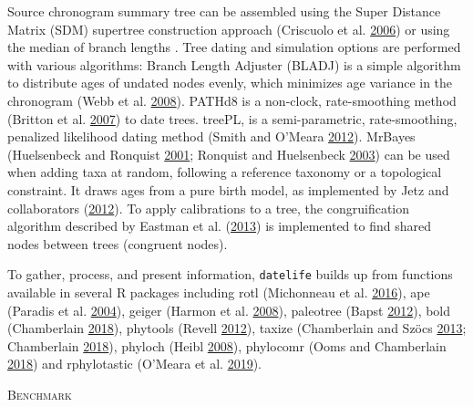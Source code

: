 \documentclass[]{article}
\begin{document}
Source chronogram summary tree can be assembled using the Super Distance Matrix
(SDM) supertree construction approach (Criscuolo et al. \protect\hyperlink{ref-Criscuolo2006}{2006}) or using the median of branch
lengths .
Tree dating and simulation options are performed with various algorithms:
Branch Length Adjuster (BLADJ) is a simple algorithm to distribute ages of undated
nodes evenly, which minimizes age variance in the chronogram (Webb et al. \protect\hyperlink{ref-Webb2008}{2008}).
PATHd8 is a non-clock, rate-smoothing method (Britton et al. \protect\hyperlink{ref-Britton2007}{2007}) to date trees.
treePL, is a semi-parametric, rate-smoothing, penalized likelihood dating method
(Smith and O'Meara \protect\hyperlink{ref-Smith2012}{2012}).
MrBayes (Huelsenbeck and Ronquist \protect\hyperlink{ref-Huelsenbeck2001}{2001}; Ronquist and Huelsenbeck \protect\hyperlink{ref-Ronquist2003}{2003}) can be used when adding taxa at
random, following a reference taxonomy or a topological constraint. It draws ages
from a pure birth model, as implemented by Jetz and collaborators (\protect\hyperlink{ref-Jetz2012}{2012}).
To apply calibrations to a tree, the congruification algorithm described by Eastman et al. (\protect\hyperlink{ref-Eastman2013}{2013})
is implemented to find shared nodes between trees (congruent nodes).

To gather, process, and present information, \texttt{datelife} builds up from functions
available in several R packages including rotl (Michonneau et al. \protect\hyperlink{ref-Michonneau2016}{2016}), ape (Paradis et al. \protect\hyperlink{ref-Paradis2004}{2004}),
geiger (Harmon et al. \protect\hyperlink{ref-Harmon2008}{2008}), paleotree (Bapst \protect\hyperlink{ref-Bapst2012a}{2012}), bold (Chamberlain \protect\hyperlink{ref-Chamberlain2018}{2018}), phytools (Revell \protect\hyperlink{ref-Revell2012}{2012}),
taxize (Chamberlain and Szöcs \protect\hyperlink{ref-Chamberlain2013}{2013}; Chamberlain \protect\hyperlink{ref-Chamberlain2018}{2018}), phyloch (Heibl \protect\hyperlink{ref-Heibl2008}{2008}), phylocomr (Ooms and Chamberlain \protect\hyperlink{ref-Ooms2018}{2018})
and rphylotastic (O'Meara et al. \protect\hyperlink{ref-Omeara2019}{2019}).

\begin{center}
\textsc{Benchmark}
\end{center}
\end{document}
